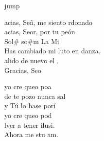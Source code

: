 \begin{cancion}jump\\
	\begin{chorus}%
		acias, Señ, me siento rdonado\\
		acias, Seor, por tu peón.\\
	Sol#     so#m   La       Mi\\
	Has cambiado mi luto en danza.\\
		alido de nuevo el .\\
		Gracias, Seo  \jump\\
	\end{chorus}%
	yo cre queo poa\\
	de te pozo nunca sal\\
	y Tú lo hase porí\\
	\jump
	yo cre queo pod\\
	lver a tener ilusi.\\
	Ahora me stu am. \\
\end{cancion}%
